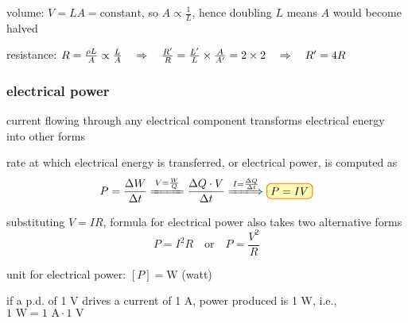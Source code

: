 
\sol volume: $V=LA = \text{constant}$, so $A \propto \frac{1}{L}$, hence doubling $L$ means $A$ would become halved

\vspace*{0.3em} resistance: $R = \frac{\rho L}{A} \propto \frac{L}{A} \quad \Rightarrow \quad \frac{R'}{R}  = \frac{L'}{L} \times \frac{A}{A'} = 2 \times 2 \quad \Rightarrow \quad R' = 4R $ \eoe

\subsubsection{electrical power}

current flowing through any electrical component transforms electrical energy into other forms

rate at which electrical energy is transferred, or electrical power, is computed as
\begin{equation*}
P = \frac{\Delta W}{\Delta  t} \xlongequal{V=\frac{W}{Q}} \frac{\Delta Q \cdot V}{\Delta t} \xLongrightarrow{I = \frac{\Delta Q}{\Delta t}} \boxed{P=IV}
\end{equation*}

substituting $V=IR$, formula for electrical power also takes two alternative forms
\begin{equation*}
\boxed{P=I^2 R} \quad \text{or} \quad \boxed{P=\frac{V^2}{R}}
\end{equation*}

\cmt unit for electrical power: $[P] = \text{W}$ (watt)

if a p.d. of 1 V drives a current of 1 A, power produced is 1 W, i.e., $1 \text{ W} = 1 \text{ A} \cdot 1 \text{ V}$



%




